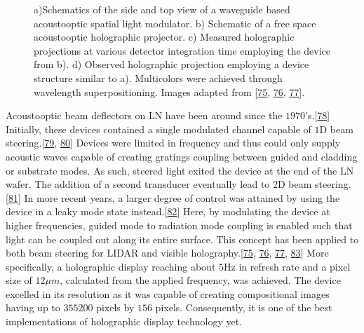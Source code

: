 \documentclass[a4paper,10pt,english,openany,oneside]{jupyterBook}
\begin{document}
\begin{figure}[htbp]
\centering
\capstart

\noindent{}
\caption{a)Schematics of the side and top view of a waveguide based acousto\sphinxhyphen{}optic spatial light modulator. b) Schematic of a free space acousto\sphinxhyphen{}optic holographic projector. c) Measured holographic projections at various detector integration time employing the device from b). d) Observed holographic projection employing a device structure similar to a). Multicolors were achieved through wavelength superpositioning. Images adapted from {[}\hyperlink{cite.bib:id262}{75}, \hyperlink{cite.bib:id98}{76}, \hyperlink{cite.bib:id18}{77}{]}.}\label{\detokenize{sota:chapter2-image14}}\end{figure}

\sphinxAtStartPar
Acousto\sphinxhyphen{}optic beam deflectors on LN have been around since the \(1970\)’s.{[}\hyperlink{cite.bib:id210}{78}{]} Initially, these devices contained a single modulated channel capable of \(1\)D beam steering.{[}\hyperlink{cite.bib:id67}{79}, \hyperlink{cite.bib:id89}{80}{]} Devices were limited in frequency and thus could only supply acoustic waves capable of creating gratings coupling between guided and cladding or substrate modes. As such, steered light exited the device at the end of the LN wafer. The addition of a second transducer eventually lead to 2D beam steering.{[}\hyperlink{cite.bib:id211}{81}{]} In more recent years, a larger degree of control was attained by using the device in a leaky mode state instead.{[}\hyperlink{cite.bib:id399}{82}{]} Here, by modulating the device at higher frequencies, guided mode to radiation mode coupling is enabled such that light can be coupled out along its entire surface. This concept has been applied to both beam steering for LIDAR and visible holography.{[}\hyperlink{cite.bib:id262}{75}, \hyperlink{cite.bib:id98}{76}, \hyperlink{cite.bib:id18}{77}, \hyperlink{cite.bib:id184}{83}{]} More specifically, a holographic display reaching about \(5\)Hz in refresh rate and a pixel size of \(12\mu m\), calculated from the applied frequency, was achieved. The device excelled in its resolution as it was capable of creating compositional images having up to \(355200\) pixels by \(156\) pixels. Consequently, it is one of the best implementations of holographic display technology yet.
\end{document}
